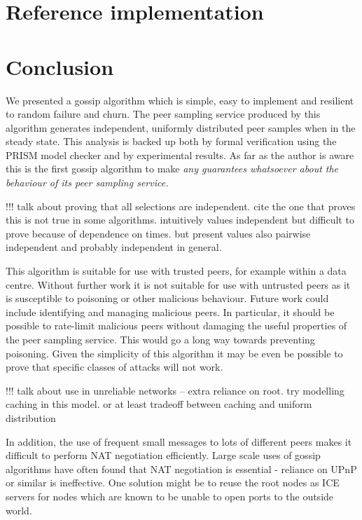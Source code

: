 \documentclass[a4paper,10pt]{article}
\begin{document}
\section{Reference implementation}

\section{Conclusion}

We presented a gossip algorithm which is simple, easy to implement and resilient to random failure and churn. The peer sampling service produced by this algorithm generates independent, uniformly distributed peer samples when in the steady state. This analysis is backed up both by formal verification using the PRISM model checker and by experimental results. As far as the author is aware this is the first gossip algorithm to make \em any \em guarantees whatsoever about the behaviour of its peer sampling service.

!!! talk about proving that all selections are independent. cite the one that proves this is not true in some algorithms. intuitively values independent but difficult to prove because of dependence on times. but present values also pairwise independent and probably independent in general.

This algorithm is suitable for use with trusted peers, for example within a data centre. Without further work it is not suitable for use with untrusted peers as it is susceptible to poisoning or other malicious behaviour. Future work could include identifying and managing malicious peers. In particular, it should be possible to rate-limit malicious peers without damaging the useful properties of the peer sampling service. This would go a long way towards preventing poisoning. Given the simplicity of this algorithm it may be even be possible to prove that specific classes of attacks will not work.

!!! talk about use in unreliable networks -- extra reliance on root. try modelling caching in this model. or at least tradeoff between caching and uniform distribution

In addition, the use of frequent small messages to lots of different peers makes it difficult to perform NAT negotiation efficiently. Large scale uses of gossip algorithms have often found that NAT negotiation is essential - reliance on UPnP or similar is ineffective. One solution might be to reuse the root nodes as ICE servers for nodes which are known to be unable to open ports to the outside world.
\end{document}
